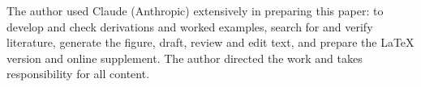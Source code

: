 \documentclass[11pt,a4paper]{article}
\begin{document}
\begin{aespubliconly}
The author used Claude (Anthropic) extensively in preparing this paper: to develop and check derivations and worked examples, search for and verify literature, generate the figure, draft, review and edit text, and prepare the LaTeX version and online supplement. The author directed the work and takes responsibility for all content.
\end{aespubliconly}


\end{document}
